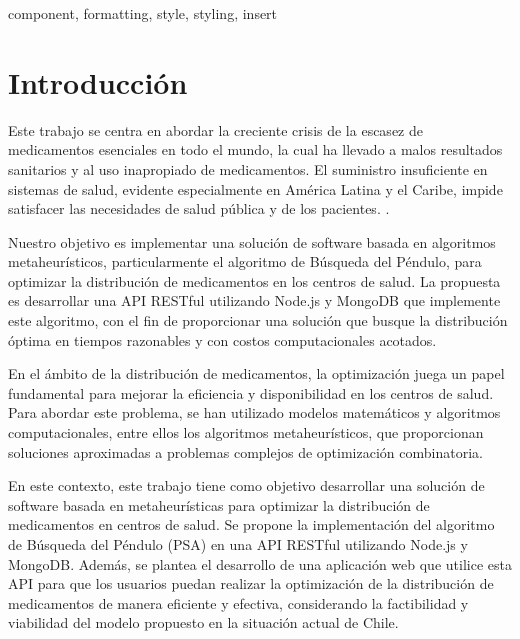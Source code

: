 \documentclass[conference]{IEEEtran}
\begin{document}
\begin{IEEEkeywords}
    component, formatting, style, styling, insert
\end{IEEEkeywords}

\section{Introducción}

Este trabajo se centra en abordar la creciente crisis de la escasez de medicamentos esenciales en todo el mundo, la cual ha llevado a malos resultados sanitarios y al uso inapropiado de medicamentos. El suministro insuficiente en sistemas de salud, evidente especialmente en América Latina y el Caribe, impide satisfacer las necesidades de salud pública y de los pacientes. \cite{OMS2016}.

Nuestro objetivo es implementar una solución de software basada en algoritmos metaheurísticos, particularmente el algoritmo de Búsqueda del Péndulo, para optimizar la distribución de medicamentos en los centros de salud. La propuesta es desarrollar una API RESTful utilizando Node.js y MongoDB que implemente este algoritmo, con el fin de proporcionar una solución que busque la distribución óptima en tiempos razonables y con costos computacionales acotados.

En el ámbito de la distribución de medicamentos, la optimización juega un papel fundamental para mejorar la eficiencia y disponibilidad en los centros de salud. Para abordar este problema, se han utilizado modelos matemáticos y algoritmos computacionales, entre ellos los algoritmos metaheurísticos, que proporcionan soluciones aproximadas a problemas complejos de optimización combinatoria.

En este contexto, este trabajo tiene como objetivo desarrollar una solución de software basada en metaheurísticas para optimizar la distribución de medicamentos en centros de salud. Se propone la implementación del algoritmo de Búsqueda del Péndulo (PSA) en una API RESTful utilizando Node.js y MongoDB. Además, se plantea el desarrollo de una aplicación web que utilice esta API para que los usuarios puedan realizar la optimización de la distribución de medicamentos de manera eficiente y efectiva, considerando la factibilidad y viabilidad del modelo propuesto en la situación actual de Chile.
\end{document}
